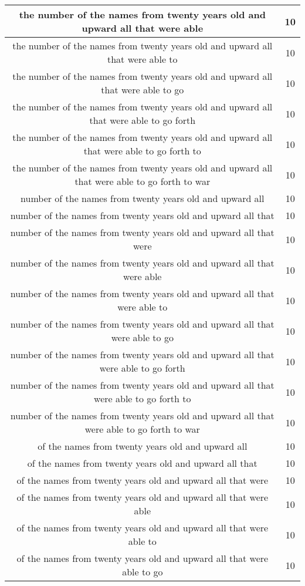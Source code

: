 \begin{center}
\begin{longtable}{|c|c|}
the number of the names from twenty years old and upward all that were able & 10\\ \hline 
the number of the names from twenty years old and upward all that were able to & 10\\ \hline 
the number of the names from twenty years old and upward all that were able to go & 10\\ \hline 
the number of the names from twenty years old and upward all that were able to go forth & 10\\ \hline 
the number of the names from twenty years old and upward all that were able to go forth to & 10\\ \hline 
the number of the names from twenty years old and upward all that were able to go forth to war & 10\\ \hline 
number of the names from twenty years old and upward all & 10\\ \hline 
number of the names from twenty years old and upward all that & 10\\ \hline 
number of the names from twenty years old and upward all that were & 10\\ \hline 
number of the names from twenty years old and upward all that were able & 10\\ \hline 
number of the names from twenty years old and upward all that were able to & 10\\ \hline 
number of the names from twenty years old and upward all that were able to go & 10\\ \hline 
number of the names from twenty years old and upward all that were able to go forth & 10\\ \hline 
number of the names from twenty years old and upward all that were able to go forth to & 10\\ \hline 
number of the names from twenty years old and upward all that were able to go forth to war & 10\\ \hline 
of the names from twenty years old and upward all & 10\\ \hline 
of the names from twenty years old and upward all that & 10\\ \hline 
of the names from twenty years old and upward all that were & 10\\ \hline 
of the names from twenty years old and upward all that were able & 10\\ \hline 
of the names from twenty years old and upward all that were able to & 10\\ \hline 
of the names from twenty years old and upward all that were able to go & 10\\ \hline 

\end{longtable}
\end{center}

